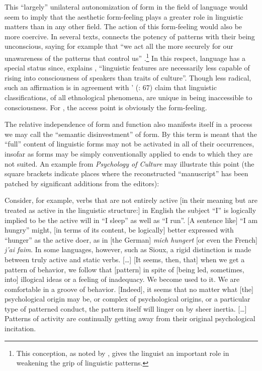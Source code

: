 \documentclass[output=paper]{langscibook}
\begin{document}
This ``largely'' unilateral autonomization of form in the field of language would seem to imply that the aesthetic form-feeling plays a greater role in linguistic matters than in any other field. The action of this form-feeling would also be more coercive. In several texts, {\Sapir} connects the potency of patterns with their being unconscious, saying for example that ``we act all the more securely for our unawareness of the patterns that control us'' \citep[549]{Sapir1927a}.\footnote{This conception, as noted by \citet{Joseph2002sapirwhorf}, gives the linguist an important role in weakening the grip of linguistic patterns.} In this respect, language has a special status since, explains \citet[100]{Sapir1912}, ``linguistic features are necessarily less capable of rising into consciousness of speakers than traits of culture''. Though less radical, such an affirmation is in agreement with {\Boas}' (\citeyear{Boas1911}: 67) claim that linguistic classifications, of all ethnological phenomena, are unique in being inaccessible to consciousness. For {\Sapir}, the access point is obviously the form-feeling. 

The relative independence of form and function also manifests itself in a process we may call the ``semantic disinvestment'' of form. By this term is meant that the ``full'' content of linguistic forms may not be activated in all of their occurrences, insofar as forms may be simply conventionally applied to ends to which they are not suited. An example from \emph{Psychology of Culture} may illustrate this point (the square brackets indicate places where the reconstructed ``manuscript'' has been patched by significant additions from the editors): 

\begin{modquote}
Consider, for example, verbs that are not entirely active [in their meaning but are treated as active in the linguistic structure:] in English the subject ``I'' is logically implied to be the active will in ``I sleep'' as well as ``I run''. [A sentence like] ``I am hungry'' might, [in terms of its content, be logically] better expressed with ``hunger'' as the active doer, as in [the German] \emph{mich hungert} [or even the French] \emph{j’ai faim}. In some languages, however, such as Sioux, a rigid distinction is made between truly active and static verbs. […] [It seems, then, that] when we get a pattern of behavior, we follow that [pattern] in spite of [being led, sometimes, into] illogical ideas or a feeling of inadequacy. We become used to it. We are comfortable in a groove of behavior. [Indeed], it seems that no matter what [the] psychological origin may be, or complex of psychological origins, or a particular type of patterned conduct, the pattern itself will linger on by sheer inertia. […] Patterns of activity are continually getting away from their original psychological incitation. \citep[109--110]{Sapir2002}
\end{modquote}
\end{document}
